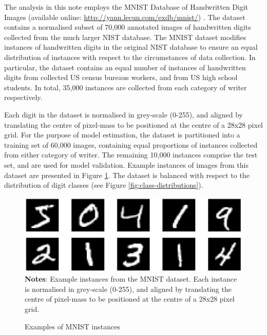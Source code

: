 
The analysis in this note employs the MNIST Database of Handwritten Digit Images (available online: \url{http://yann.lecun.com/exdb/mnist/}) \cite{lecun1998gradient}. The dataset contains a normalised subset of 70,000 annotated images of handwritten digits collected from the much larger NIST database.
The MNIST dataset modifies instances of handwritten digits in the original NIST database to ensure an equal distribution of instances with respect to the circumstances of data collection.
In particular, the dataset contains an equal number of instances of handwritten digits from collected US census bureaus workers, and from US high school students. In total, 35,000 instances are collected from each category of writer respectively.

Each digit in the dataset is normalised in grey-scale (0-255), and aligned by translating the centre of pixel-mass to be positioned at the centre of a 28x28 pixel grid. 
For the purpose of model estimation, the dataset is partitioned into a training set of 60,000 images, containing equal proportions of instances collected from either category of writer.
The remaining 10,000 instances comprise the test set, and are used for model validation.
Example instances of images from this dataset are presented in Figure \ref{fig:instance-examples}.
The dataset is balanced with respect to the distribution of digit classes (see Figure \ref{fig:class-distributions}).

\begin{figure}
    \caption{Examples of MNIST instances}
	\label{fig:instance-examples}
	\includegraphics[width=1.0\textwidth]{graphics/instance_examples.pdf}
    \textbf{Notes}: Example instances from the MNIST dataset. Each instance is normalised in grey-scale (0-255), and aligned by translating the centre of pixel-mass to be positioned at the centre of a 28x28 pixel grid. 
\end{figure}

